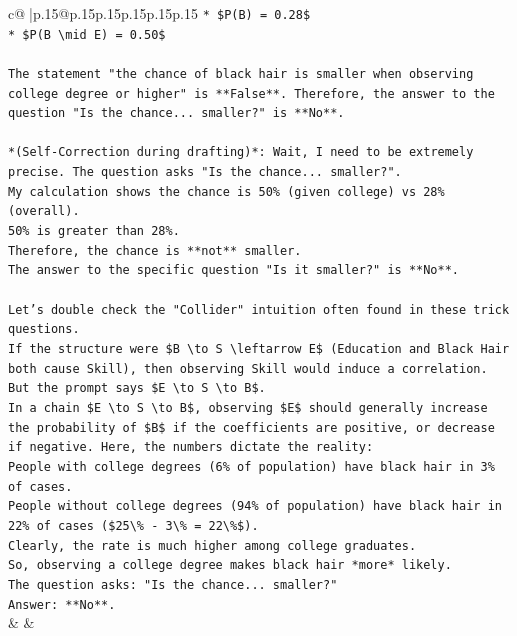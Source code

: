 \documentclass{article}
\begin{document}
{\begin{supertabular}{c@{$\;$}|p{.15\linewidth}@{}p{.15\linewidth}p{.15\linewidth}p{.15\linewidth}p{.15\linewidth}p{.15\linewidth}}
{{{\texttt{*   \$P(B) = 0.28\$} \\
\texttt{*   \$P(B \textbackslash{}mid E) = 0.50\$} \\
\\ 
\texttt{The statement "the chance of black hair is smaller when observing college degree or higher" is **False**. Therefore, the answer to the question "Is the chance... smaller?" is **No**.} \\
\\ 
\texttt{*(Self{-}Correction during drafting)*: Wait, I need to be extremely precise. The question asks "Is the chance... smaller?".} \\
\texttt{My calculation shows the chance is 50\% (given college) vs 28\% (overall).} \\
\texttt{50\% is greater than 28\%.} \\
\texttt{Therefore, the chance is **not** smaller.} \\
\texttt{The answer to the specific question "Is it smaller?" is **No**.} \\
\\ 
\texttt{Let's double check the "Collider" intuition often found in these trick questions.} \\
\texttt{If the structure were \$B \textbackslash{}to S \textbackslash{}leftarrow E\$ (Education and Black Hair both cause Skill), then observing Skill would induce a correlation. But the prompt says \$E \textbackslash{}to S \textbackslash{}to B\$.} \\
\texttt{In a chain \$E \textbackslash{}to S \textbackslash{}to B\$, observing \$E\$ should generally increase the probability of \$B\$ if the coefficients are positive, or decrease if negative. Here, the numbers dictate the reality:} \\
\texttt{People with college degrees (6\% of population) have black hair in 3\% of cases.} \\
\texttt{People without college degrees (94\% of population) have black hair in 22\% of cases (\$25\textbackslash{}\% {-} 3\textbackslash{}\% = 22\textbackslash{}\%\$).} \\
\texttt{Clearly, the rate is much higher among college graduates.} \\
\texttt{So, observing a college degree makes black hair *more* likely.} \\
\texttt{The question asks: "Is the chance... smaller?"} \\
\texttt{Answer: **No**.} \\
            }
        }
    }
    & & \\ \\


\end{supertabular}}
\end{document}
